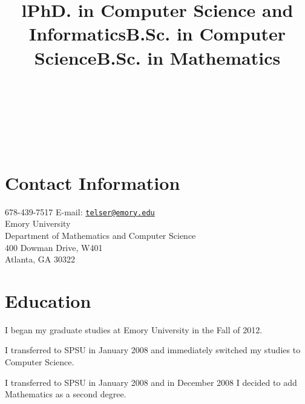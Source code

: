 \documentclass[margintitle,line]{res}
\begin{document}

\begin{resume}

\begin{format}
\\
\title{l}\\
\body\\
\end{format}



\section{Contact Information}

678-439-7517 \hfill {E-mail:} \href{mailto:telser@emory.edu}{\nolinkurl{telser@emory.edu}} \\
Emory University \\
Department of Mathematics and Computer Science \\
400 Dowman Drive, W401 \\
Atlanta, GA 30322


\section{Education}

\title{PhD. in Computer Science and Informatics}
\begin{position}
I began my graduate studies at Emory University in the Fall of 2012.
\end{position}

\title{B.Sc. in Computer Science}
\begin{position}
  I transferred to SPSU in January 2008 and immediately switched my studies to Computer Science. 
\end{position}


\title{B.Sc. in Mathematics}
\begin{position}
   I transferred to SPSU in January 2008 and in December 2008 I decided to add Mathematics as a second degree.
\end{position}


\end{resume}
\end{document}
